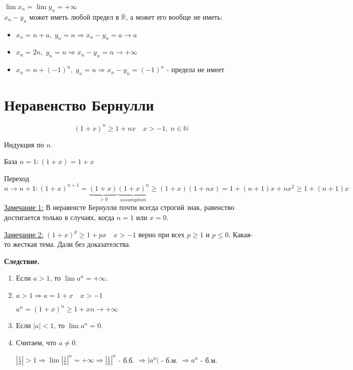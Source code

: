 \documentclass[12pt,letterpaper]{report}
\makeatletter
\renewenvironment{proof}[1][\proofname]{%
   \par\pushQED{\qed}\normalfont%
   \topsep6\p@\@plus6\p@\relax
   \trivlist\item[\hskip\labelsep\bfseries#1\@addpunct{.}]%
   \ignorespaces
}{%
   \popQED\endtrivlist\@endpefalse
}
\makeatother
\begin{document}
$\lim x_n = \lim y_n = +\infty$ \\
$x_n - y_n$  может иметь любой предел в $\overline{\mathbb{R}}$, а может его вообще не иметь:
\begin{itemize}
    \item $x_n = n + a,\; y_n = n \Rightarrow x_n - y_n = a \to a$
    \item $x_n = 2n,\; y_n = n \Rightarrow x_n - y_n = n \to +\infty$
    \item $x_n = n + (-1)^n,\; y_n = n \Rightarrow x_n - y_n = (-1)^n$ - предела не имеет
\end{itemize}

\section{Неравенство Бернулли}
\[ (1 + x)^n \geqslant 1 + nx \quad x > -1,\; n \in \mathbb{N} \]
\begin{proof}
    Индукция по $n$.
    
    База $n = 1: (1 + x) = 1 + x$
    
    Переход $n \to n + 1: (1 + x)^{n + 1} = \underbrace{(1 + x)}_{> 0}\underbrace{(1 + x)^n}_{assumption} \geqslant (1 + x)(1 + nx) = 1 + (n + 1)x + nx^2 \geqslant 1 + (n + 1)x$
\end{proof}
\underline{Замечание 1:} В неравенсте Бернулли почти всегда строгий знак, равенство достигается только в случаях, когда $n = 1$ или $x = 0$.

\underline{Замечание 2:} $(1 + x)^p \geqslant 1 + px \quad x > -1$ верно при всех $p \geqslant 1$ и $p \leqslant 0$. Какая-то жесткая тема. Дали без доказателства.
\vspace{0.5cm}

\textbf{Следствие.} 
\begin{enumerate}
    \item Если $a > 1$, то $\lim a^n = +\infty$.
    \begin{proof}
        $a > 1 \Rightarrow a = 1 + x \quad x > -1$
        
        $a^n = (1 + x)^n \geqslant 1 + xn \to +\infty$
    \end{proof}
    \item Если $|a| < 1$, то $\lim a^n = 0$.
    \begin{proof}
        Считаем, что $a \neq 0$.
        
        $|\frac{1}{a}| > 1 \Rightarrow \lim |\frac{1}{a}|^n = +\infty \Rightarrow |\frac{1}{a}|^n$ - б.б. $\Rightarrow |a^n|$ - б.м. $\Rightarrow a^n$ - б.м.
    \end{proof}
\end{enumerate}
\end{document}
